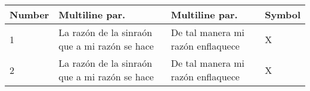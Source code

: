 \documentclass[a4paper,twoside,titlepage,12pt]{article}
\renewcommand{\tabularxcolumn}[1]{>{\small}m{#1}}
\begin{document}
\newpage
\begin{tabularx}{0.5\linewidth}{M{2cm} X X M{2cm}}
    \toprule
    Number & Multiline par. & Multiline par. & Symbol \\  & La razón de la sinraón que a mi razón se hace & De tal manera mi razón enflaquece & X\\
    2 & La razón de la sinraón que a mi razón se hace & De tal manera mi razón enflaquece & X\\ 
    \bottomrule
\end{tabularx}


        
        
        
        
        
        
\end{document}
